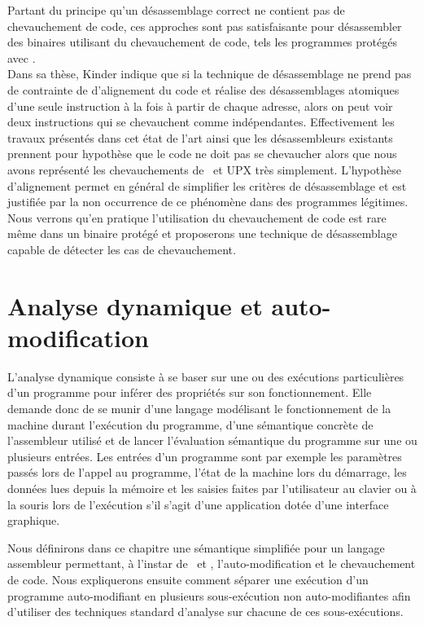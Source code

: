 Partant du principe qu'un désassemblage correct ne contient pas de chevauchement de code, ces approches sont pas satisfaisante pour désassembler des binaires utilisant du chevauchement de code, tels les programmes protégés avec \telock.
\\

Dans sa thèse, Kinder \cite{Kinder10} indique que si la technique de désassemblage ne prend pas de contrainte de d'alignement du code et réalise des désassemblages atomiques d'une seule instruction à la fois à partir de chaque adresse, alors on peut voir deux instructions qui se chevauchent comme indépendantes. Effectivement les travaux présentés dans cet état de l'art ainsi que les désassembleurs existants prennent pour hypothèse que le code ne doit pas se chevaucher alors que nous avons représenté les chevauchements de \telock\ et UPX très simplement. L'hypothèse d'alignement permet en général de simplifier les critères de désassemblage et est justifiée par la non occurrence de ce phénomène dans des programmes légitimes.
Nous verrons qu'en pratique l'utilisation du chevauchement de code est rare même dans un binaire protégé et proposerons une technique de désassemblage capable de détecter les cas de chevauchement.


\section{Analyse dynamique et auto-modification}
L'analyse dynamique consiste à se baser sur une ou des exécutions particulières d'un programme pour inférer des propriétés sur son fonctionnement.
Elle demande donc de se munir d'une langage modélisant le fonctionnement de la machine durant l'exécution du programme, d'une sémantique concrète de l'assembleur utilisé et de lancer l'évaluation sémantique du programme sur une ou plusieurs entrées.
Les entrées d'un programme sont par exemple les paramètres passés lors de l'appel au programme, l'état de la machine lors du démarrage, les données lues depuis la mémoire et les saisies faites par l'utilisateur au clavier ou à la souris lors de l'exécution s'il s'agit d'une application dotée d'une interface graphique.

Nous définirons dans ce chapitre une sémantique simplifiée pour un langage assembleur permettant, à l'instar de \xq\ et \xs, l'auto-modification et le chevauchement de code. Nous expliquerons ensuite comment séparer une exécution d'un programme auto-modifiant en plusieurs sous-exécution non auto-modifiantes afin d'utiliser des techniques standard d'analyse sur chacune de ces sous-exécutions.



